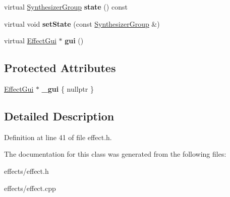 \begin{DoxyCompactItemize}
\item 
\mbox{\label{class_ms_1_1_effect_a7bd17ffe91c1ad90f4f0646b652f4ccd}} 
virtual \hyperlink{class_ms_1_1_synthesizer_group}{Synthesizer\+Group} {\bfseries state} () const
\item 
\mbox{\label{class_ms_1_1_effect_a3eb6d1d2001a5d5510f177db9188e71d}} 
virtual void {\bfseries set\+State} (const \hyperlink{class_ms_1_1_synthesizer_group}{Synthesizer\+Group} \&)
\item 
\mbox{\label{class_ms_1_1_effect_a40243b1b9aa04ee5c8c1a3ec547cdae5}} 
virtual \hyperlink{class_ms_1_1_effect_gui}{Effect\+Gui} $\ast$ {\bfseries gui} ()
\end{DoxyCompactItemize}
\subsection*{Protected Attributes}
\begin{DoxyCompactItemize}
\item 
\mbox{\label{class_ms_1_1_effect_ad8db3145b3213ad6ab9a9142c89c6dc9}} 
\hyperlink{class_ms_1_1_effect_gui}{Effect\+Gui} $\ast$ {\bfseries \+\_\+gui} \{ nullptr \}
\end{DoxyCompactItemize}


\subsection{Detailed Description}


Definition at line 41 of file effect.\+h.



The documentation for this class was generated from the following files\+:\begin{DoxyCompactItemize}
\item 
effects/effect.\+h\item 
effects/effect.\+cpp\end{DoxyCompactItemize}
